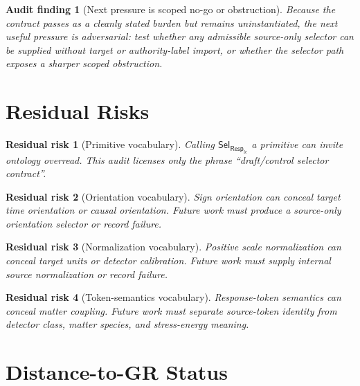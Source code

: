 \documentclass[11pt]{article}
\newcommand{\RespLC}{\mathsf{Resp}_{\mathrm{lc}}}
\newcommand{\SelResp}{\mathsf{Sel}_{\RespLC}}
\newtheorem{auditfinding}{Audit finding}
\newtheorem{residualrisk}{Residual risk}
\begin{document}
\begin{auditfinding}[Next pressure is scoped no-go or obstruction]
Because the contract passes as a cleanly stated burden but remains
uninstantiated, the next useful pressure is adversarial: test whether
any admissible source-only selector can be supplied without target or
authority-label import, or whether the selector path exposes a sharper
scoped obstruction.
\end{auditfinding}

\section{Residual Risks}

\begin{residualrisk}[Primitive vocabulary]
Calling \(\SelResp\) a primitive can invite ontology overread. This
audit licenses only the phrase ``draft/control selector contract''.
\end{residualrisk}

\begin{residualrisk}[Orientation vocabulary]
Sign orientation can conceal target time orientation or causal
orientation. Future work must produce a source-only orientation
selector or record failure.
\end{residualrisk}

\begin{residualrisk}[Normalization vocabulary]
Positive scale normalization can conceal target units or detector
calibration. Future work must supply internal source normalization or
record failure.
\end{residualrisk}

\begin{residualrisk}[Token-semantics vocabulary]
Response-token semantics can conceal matter coupling. Future work must
separate source-token identity from detector class, matter species, and
stress-energy meaning.
\end{residualrisk}

\section{Distance-to-GR Status}
\end{document}
